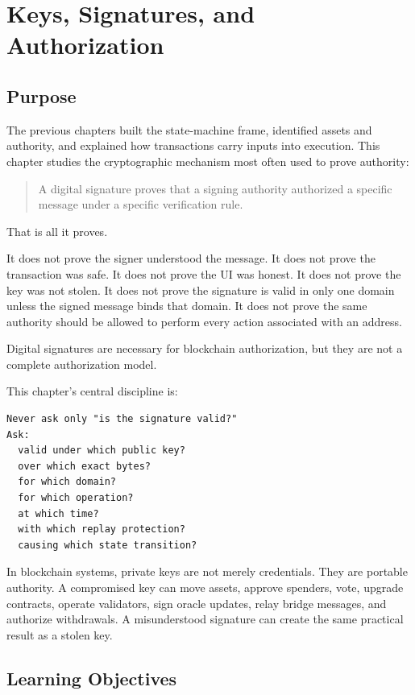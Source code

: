 \chapter{Keys, Signatures, and Authorization}

\section{Purpose}

The previous chapters built the state-machine frame, identified assets
and authority, and explained how transactions carry inputs into
execution. This chapter studies the cryptographic mechanism most often
used to prove authority:

\begin{quote}
A digital signature proves that a signing authority authorized a
specific message under a specific verification rule.
\end{quote}

That is all it proves.

It does not prove the signer understood the message. It does not prove
the transaction was safe. It does not prove the UI was honest. It does
not prove the key was not stolen. It does not prove the signature is
valid in only one domain unless the signed message binds that domain. It
does not prove the same authority should be allowed to perform every
action associated with an address.

Digital signatures are necessary for blockchain authorization, but they
are not a complete authorization model.

This chapter's central discipline is:

\begin{lstlisting}
Never ask only "is the signature valid?"
Ask:
  valid under which public key?
  over which exact bytes?
  for which domain?
  for which operation?
  at which time?
  with which replay protection?
  causing which state transition?
\end{lstlisting}

In blockchain systems, private keys are not merely credentials. They are
portable authority. A compromised key can move assets, approve spenders,
vote, upgrade contracts, operate validators, sign oracle updates, relay
bridge messages, and authorize withdrawals. A misunderstood signature
can create the same practical result as a stolen key.

\section{Learning Objectives}

